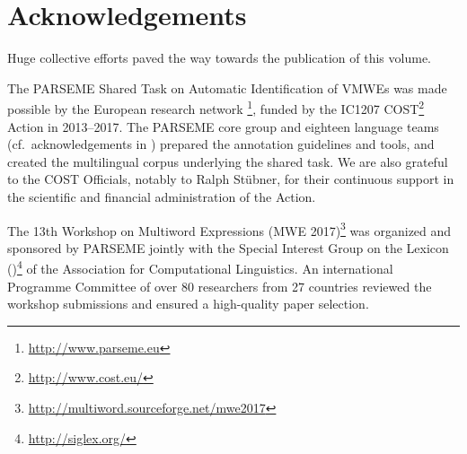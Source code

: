 \documentclass[output=paper,
modfonts,
]{langscibook}
\begin{document}





\section{Acknowledgements}
Huge collective efforts paved the way towards the publication of this volume. 

The  PARSEME Shared Task on Automatic Identification of VMWEs was made possible by the European research network \footnote{\url{http://www.parseme.eu}}, funded by the IC1207 COST\footnote{\url{http://www.cost.eu/}} Action in 2013--2017. The PARSEME core group and eighteen language teams (cf.~acknowledgements in ) prepared the annotation guidelines and tools, and created the multilingual corpus underlying the shared task. We are also grateful to the COST Officials, notably to Ralph Stübner, for their %
continuous support in the scientific and financial administration of the Action. 

The 13th Workshop on Multiword Expressions (MWE 2017)\footnote{\url{http://multiword.sourceforge.net/mwe2017}}  was organized and sponsored by PARSEME jointly with the Special Interest Group on the Lexicon ()\footnote{\url{http://siglex.org/}} of the Association for Computational Linguistics. An international Programme Committee of over 80 researchers from 27 countries reviewed the workshop submissions and ensured a high-quality paper selection.
\end{document}
